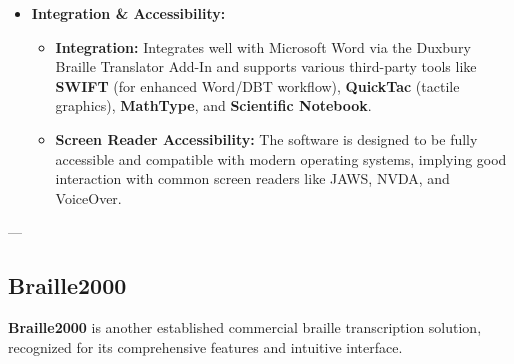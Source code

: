\begin{itemize}
\begin{itemize}
    \end{itemize}
    \item \textbf{Integration & Accessibility:}
    \begin{itemize}
        \item \textbf{Integration:} Integrates well with Microsoft Word via the Duxbury Braille Translator Add-In and supports various third-party tools like \textbf{SWIFT} (for enhanced Word/DBT workflow), \textbf{QuickTac} (tactile graphics), \textbf{MathType}, and \textbf{Scientific Notebook}.
        \item \textbf{Screen Reader Accessibility:} The software is designed to be fully accessible and compatible with modern operating systems, implying good interaction with common screen readers like JAWS, NVDA, and VoiceOver.
    \end{itemize}
\end{itemize}

---

\subsection{Braille2000}
\textbf{Braille2000} is another established commercial braille transcription solution, recognized for its comprehensive features and intuitive interface.

